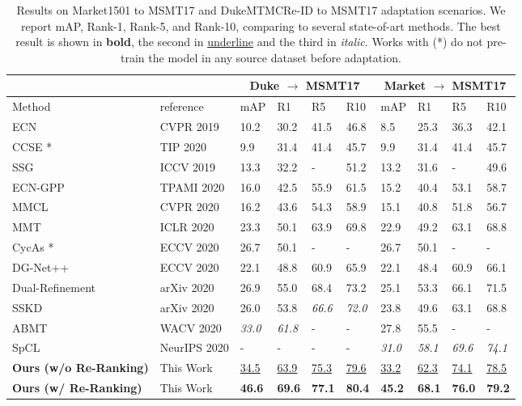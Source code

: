 \documentclass[journal]{IEEEtran}
\begin{document}
\begin{table*}[ht]
\caption{Results on Market1501 to MSMT17 and DukeMTMCRe-ID to MSMT17 adaptation scenarios. We report mAP, Rank-1, Rank-5, and Rank-10, comparing to several state-of-art methods. The best result is shown in \textbf{bold}, the second in \underline{underline} and the third in \textit{italic}. Works with (*) do not pre-train the model in any source dataset before adaptation.}
\label{tab:msmt17}
\centering
\begin{tabular}{|p{2.7cm}| p{2.0cm}|p{0.8cm}|p{1.0cm}|p{1.0cm}|p{1.0cm}|p{0.8cm}|p{1.0cm}|p{1.0cm}|p{1.0cm}|}
\hline
\multicolumn{1}{|c|}{} &
\multicolumn{1}{|c|}{} &
\multicolumn{4}{|c|}{Duke $\rightarrow$ MSMT17} & \multicolumn{4}{|c|}{Market $\rightarrow$ MSMT17} \\
\hline
Method & reference & mAP & R1 & R5 & R10
& mAP & R1 & R5 & R10 \\ \hline
ECN \cite{zhong2019invariance} & CVPR 2019 & 10.2 & 30.2 & 41.5 & 46.8 & 8.5 & 25.3 & 36.3 & 42.1 \\
CCSE \cite{lin2020unsupervisedccse}* & TIP 2020 & 9.9 & 31.4 & 41.4 & 45.7 & 9.9 & 31.4 & 41.4 & 45.7 \\
SSG \cite{fu2019self} & ICCV 2019 & 13.3 & 32.2 & - & 51.2 & 13.2 & 31.6 & - & 49.6 \\
ECN-GPP \cite{zhong2020learning} & TPAMI 2020 & 16.0 & 42.5 & 55.9 & 61.5 & 15.2 & 40.4 & 53.1 & 58.7 \\
MMCL \cite{wang2020unsupervised} & CVPR 2020 & 16.2 & 43.6 & 54.3 & 58.9 & 15.1 & 40.8 & 51.8 & 56.7 \\
MMT \cite{ge2020mutual} & ICLR 2020 & 23.3 & 50.1 & 63.9 & 69.8 & 22.9 & 49.2 & 63.1 & 68.8 \\
CycAs \cite{wang2020cycas}* & ECCV 2020 & 26.7 & 50.1 & - & - & 26.7 & 50.1 & - & - \\
DG-Net++  \cite{zou2020joint} & ECCV 2020 & 22.1 & 48.8 & 60.9 & 65.9 & 22.1 & 48.4 & 60.9 & 66.1 \\
Dual-Refinement \cite{dai2020dual} & arXiv 2020 & 26.9 & 55.0 & 68.4 & 73.2 & 25.1 & 53.3 & 66.1 & 71.5 \\
SSKD \cite{yin2020sskd} & arXiv 2020 & 26.0 & 53.8 & \textit{66.6} & \textit{72.0} & 23.8 & 49.6 & 63.1 & 68.8 \\ 
ABMT \cite{chen2020enhancing} & WACV 2020 & \textit{33.0} & \textit{61.8} & - & - & 27.8 & 55.5 & - & - \\ 
SpCL \cite{ge2020self} & NeurIPS 2020 & - & - & - & - & \textit{31.0} & \textit{58.1} & \textit{69.6} & \textit{74.1} \\ \hline
\textbf{Ours (w/o Re-Ranking)} & This Work & \underline{34.5} & \underline{63.9} & \underline{75.3} & \underline{79.6} & \underline{33.2} & \underline{62.3} & \underline{74.1} & \underline{78.5} \\ \hline
\textbf{Ours (w/ Re-Ranking)} & This Work & \textbf{46.6} & \textbf{69.6} & \textbf{77.1} & \textbf{80.4} & \textbf{45.2} & \textbf{68.1} & \textbf{76.0} & \textbf{79.2} \\ \hline
\end{tabular}
\end{table*}
\end{document}
